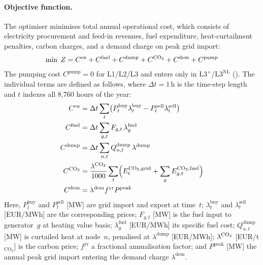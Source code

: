 \documentclass[a4paper,fleqn]{cas-dc}
\newcommand{\Lplus}{\mathrm{L3}^{+}}
\newcommand{\Lnl}{\mathrm{L3}^{\mathrm{NL}}}
\begin{document}
\paragraph{Objective function.}
The optimiser minimises total annual operational cost, which
consists of electricity procurement and feed-in revenues, fuel
expenditure, heat-curtailment penalties, carbon charges, and a
demand charge on peak grid import:
%
\begin{equation}
  \min \; Z = C^{\mathrm{en}} + C^{\mathrm{fuel}}
    + C^{\mathrm{dump}} + C^{\ce{CO2}} + C^{\mathrm{dem}}
    + C^{\mathrm{pump}}
  \label{eq:objective}
\end{equation}
%
The pumping cost $C^{\mathrm{pump}} = 0$ for L1/L2/L3 and enters
only in $\Lplus$/$\Lnl$ (). The individual
terms are defined as follows, where $\Delta t = 1\,\mathrm{h}$ is
the time-step length and $t$ indexes all 8{,}760 hours of the year:
%
\begin{align*}
C^{\mathrm{en}}   &= \Delta t \sum_t
  \bigl(P_t^{\mathrm{buy}} \lambda_t^{\mathrm{buy}}
        - P_t^{\mathrm{sell}} \lambda_t^{\mathrm{sell}}\bigr) \\
C^{\mathrm{fuel}} &= \Delta t \sum_{g,t}
  F_{g,t}\, \lambda_g^{\mathrm{fuel}} \\
C^{\mathrm{dump}} &= \Delta t \sum_{n,t}
  Q_{n,t}^{\mathrm{dump}}\, \lambda^{\mathrm{dump}} \\
C^{\ce{CO2}}      &= \frac{\lambda^{\ce{CO2}}}{1000} \sum_t
  \Bigl(E_t^{\ce{CO2},\mathrm{grid}} +
        \sum_g E_{g,t}^{\ce{CO2},\mathrm{fuel}}\Bigr) \\
C^{\mathrm{dem}}  &= \lambda^{\mathrm{dem}} f^{\mathrm{yr}}
  P^{\mathrm{peak}}
\end{align*}
%
Here, $P_t^{\mathrm{buy}}$ and $P_t^{\mathrm{sell}}$
[MW] are grid import and export at time~$t$;
$\lambda_t^{\mathrm{buy}}$ and $\lambda_t^{\mathrm{sell}}$
[EUR/MWh] are the corresponding prices; $F_{g,t}$ [MW]
is the fuel input to generator~$g$ at heating value basis;
$\lambda_g^{\mathrm{fuel}}$ [EUR/MWh] its specific fuel cost;
$Q_{n,t}^{\mathrm{dump}}$ [MW] is curtailed heat at node~$n$,
penalised at $\lambda^{\mathrm{dump}}$ [EUR/MWh];
$\lambda^{\ce{CO2}}$ [EUR/t$_{\mathrm{CO_2}}$] is the carbon
price; $f^{\mathrm{yr}}$ a fractional annualisation factor; and
$P^{\mathrm{peak}}$ [MW] the annual peak grid import entering the
demand charge $\lambda^{\mathrm{dem}}$.
\end{document}
